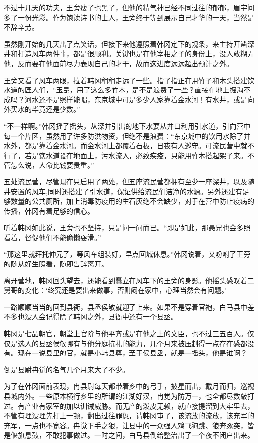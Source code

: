 不过十几天的功夫，王旁瘦了也黑了，但他的精气神已经不同过往的郁郁，眉宇间多了一份光彩。作为饱读诗书的士人，王旁终于等到展示自己才华的一天，当然是不辞辛劳。

虽然刚开始的几天出了点笑话，但接下来他遵照着韩冈定下的规条，来主持开凿深井和打造风车两件事，都是很顺利。关键也是在他宰相之子的身份上，没人敢糊弄他，反而要在他面前尽力表现自己的才干，故而这进度远远超出预计之外。

王旁又看了风车两眼，拉着韩冈稍稍走远了一些。指了指正在用竹子和木头搭建饮水道的匠人们，“玉昆，用了这么多竹木，是不是浪费了一些？直接在地上掘沟不成吗？河水还不是照样能喝，东京城中可是多少人家靠着金水河！有水井，或是向外买水的毕竟还是少数。”

“不一样啊。”韩冈摇了摇头，从深井引出的地下水要从井口利用引水道，引向营中每一个片区，虽然用了许多防洪物资，但绝不是浪费：“东京城中的饮用水除了井水外，都是靠着金水河。而金水河上都覆着石板，日夜有人巡守。可流民营中就不行了，若是饮水道设在地面上，污水流入，必致疾疫，只能用竹木搭起架子来。不管怎么说，人命比钱要贵重。”

五处流民营，尽管现在只启用了两处，但五座流民营都拥有至少一座深井，以及随井安置的风车,同时还搭建了引水道，保证供给流民们洁净的水源。另外还建有足够数量的公共厕所，加上消毒防疫用的生石灰绝不会缺少，对于在营中防止疫病的传播，韩冈有着足够的信心。

听着韩冈如此说，王旁也不坚持，只是问一问而已。“即是如此，那愚兄也会多照看着，督促他们不能偷懒耍滑。”

“那这里就拜托仲元了，等风车组装好，早点回城休息。”韩冈说着，又吩咐了王旁的随从好生照看，随即告辞离开。

离开营地，韩冈回头望去，还能看到矗立在风车下的王旁的身影。他摇头感叹着二舅哥的变化：‘终究还是要出来做事，否则闷在家中，心理当然会有问题。’

一路顺顺当当的回到县衙，县丞侯敂就迎了上来。如果不是穿着官袍，白马县中差不多也没人会记得除了韩冈之外，县衙中还有一个县丞。

韩冈是七品朝官，朝堂上官阶与他平齐或是在他之上的文臣，也不过三五百人。仅仅是选人的县丞侯敂哪有与他分庭抗礼的能力，几个月来被压制得一点存在感都没有。现在一说县里的官，就是小韩县尊，至于侯县丞，就是一摇头，他是谁啊？

倒是县尉冉觉的名气几个月来大了不少。

为了在韩冈面前表现，冉县尉每天都带着乡中的弓手，披星而出，戴月而归，巡视县城内外。一些原本横行乡里的所谓的江湖好汉，冉觉为防万一，也全都尽数敲打过。有产业有家室的加以训诫威胁。而无产的泼皮无赖，就直接提溜到大牢里去，不管有理没理先打上一顿，翻出过往罪愆，请韩冈审了，该流放的流放，该充军的充军，一点也不宽容。冉觉下手之狠，让县中的一众强人鸡飞狗跳、狼奔豕突，皆是偃旗息鼓，不敢犯事做过。一时之间，白马县倒给整治出了一个夜不闭户出来。

